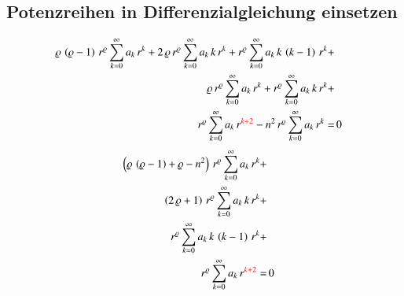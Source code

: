 \begin{refsection}
\subsection*{Potenzreihen in Differenzialgleichung einsetzen}
\begin{align*}
	\varrho \, \left( \varrho - 1 \right) \, r^{\varrho}
	\sum_{k=0}^{\infty} a_k \, r^k
	+
	2 \, \varrho \, r^{\varrho}
	\sum_{k=0}^{\infty} a_k \, k \, r^k
	+
	r^{\varrho}
	\sum_{k=0}^{\infty} a_k \, k \, \left( k - 1 \right) \, r^k
	+ \\
	\varrho \, r^{\varrho}
	\sum_{k=0}^{\infty} a_k \, r^k
	+
	r^{\varrho}
	\sum_{k=0}^{\infty} a_k \, k \, r^k
	+\\
	r^{\varrho}
	\sum_{k=0}^{\infty} a_k \, r^{\textcolor{red}{k + 2}}
	-
	n^2 \, r^{\varrho}
	\sum_{k=0}^{\infty} a_k \, r^k
	= & \, 0
\end{align*}
\begin{align*}
	\left(
	\varrho \, \left( \varrho - 1 \right)
	+
	\varrho
	-
	n^2
	\right)
	\, r^{\varrho}
	\sum_{k=0}^{\infty} a_k \, r^k
	+ \\
	\left(	
	2 \, \varrho
	+
	1
	\right)
	\, r^{\varrho}
	\sum_{k=0}^{\infty} a_k \, k \, r^k
	+ \\
	r^{\varrho}
	\sum_{k=0}^{\infty} a_k \, k \, \left( k - 1 \right) \, r^k
	+ \\
	r^{\varrho}
	\sum_{k=0}^{\infty} a_k \, r^{\textcolor{red}{k + 2}}
	= & \, 0
\end{align*}

\end{refsection}
